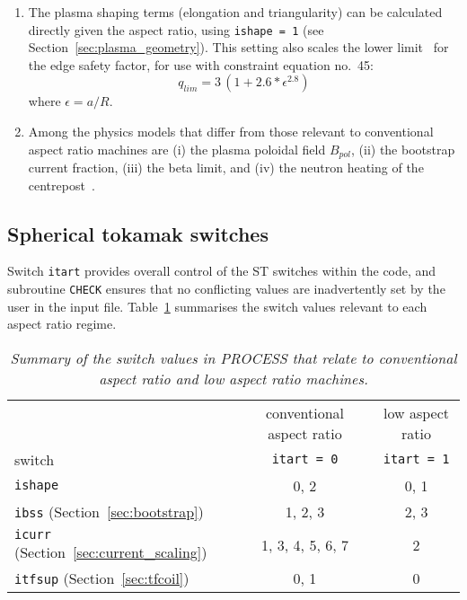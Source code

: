 \documentclass[11pt,a4paper]{report}
\newcommand{\process}{\mbox{\texttt{PROCESS}}}
\begin{document}
\begin{enumerate}
\item The plasma shaping terms (elongation and triangularity) can be
  calculated directly given the aspect ratio, using \texttt{ishape = 1} (see
  Section~\ref{sec:plasma_geometry}). This setting also scales the lower
  limit~\cite{storac} for the edge safety factor, for use with constraint
  equation no.\ 45:
  \begin{equation}
    q_{lim} = 3 \, (1 + 2.6*\epsilon^{2.8})
  \end{equation}
  where $\epsilon = a/R$. 

\item Among the physics models that differ from those relevant to conventional
  aspect ratio machines are (i) the plasma poloidal field $B_{pol}$, (ii) the
  bootstrap current fraction, (iii) the beta limit, and (iv) the neutron
  heating of the centrepost~\cite{storac}.

\end{enumerate}

\subsection{Spherical tokamak switches}

Switch \texttt{itart} provides overall control of the ST switches within the
code, and subroutine \texttt{CHECK} ensures that no conflicting values are
inadvertently set by the user in the input file. Table~\ref{tab:tart}
summarises the switch values relevant to each aspect ratio regime.
\begin{table}[tbph]
\begin{center}
  \begin{tabular}{||l|c|c||} \hline
    & conventional aspect ratio & low aspect ratio \\
    switch & \texttt{itart = 0} & \texttt{itart = 1} \\ \hline
    \texttt{ishape} & 0, 2 & 0, 1 \\
    \texttt{ibss} (Section~\ref{sec:bootstrap}) & 1, 2, 3 & 2, 3 \\
    \texttt{icurr} (Section~\ref{sec:current_scaling}) & 1, 3, 4, 5, 6, 7 & 2 \\
    \texttt{itfsup} (Section~\ref{sec:tfcoil}) & 0, 1 & 0 \\
    \hline
\end{tabular}
\end{center}
\caption[\process\ switches for spherical tokamaks]
{\label{tab:tart}
  \textit{Summary of the switch values in PROCESS that relate to
    conventional aspect ratio and low aspect ratio machines.}
}
\end{table}
\end{document}
